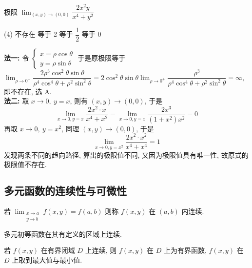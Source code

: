 \begin{example}
    极限 $\displaystyle\lim_{(x,y)\to(0,0)}\dfrac{2x^2y}{x^4+y^2}$
    \begin{tasks}(4)
        \task 不存在
        \task 等于 2
        \task 等于 $\dfrac{1}{2}$
        \task 等于 0
    \end{tasks}
\end{example}
\begin{solution}
    \textbf{法一: }令 $\begin{cases}
        x=\rho\cos\theta\\y=\rho\sin\theta
    \end{cases}$
    于是原极限等于 $\displaystyle\lim_{\rho\to0^+}\dfrac{2\rho^3\cos^2\theta\sin\theta }{\rho^4\cos^4\theta+\rho^2\sin^2\theta}=2\cos^2\theta\sin\theta\lim_{\rho\to0^+}\dfrac{\rho^3}{\rho^4\cos^4\theta+\rho^2\sin^2\theta}=\infty$, 即不存在, 选 A.\\
    \textbf{法二: }取 $x\to0,~y=x$, 则有 $(x,y)\to(0,0)$, 于是 $$\displaystyle\lim_{x\to0,y=x}\dfrac{2x^2\cdot x}{x^4+x^2}=\lim_{x\to0,y=x}\dfrac{2x^3}{(1+x^2)x^2}=0$$
    再取 $x\to0,~y=x^2$, 同理 $(x,y)\to(0,0)$, 于是 $$\displaystyle\lim_{x\to0,y=x^2}\dfrac{2x^2\cdot x^2}{x^4+x^4}=1$$
    发现两条不同的趋向路径, 算出的极限值不同, 又因为极限值具有唯一性, 故原式的极限值不存在.
\end{solution}

%     

\subsection{多元函数的连续性与可微性}

\begin{definition}
    若 $\displaystyle \lim _{\substack{x \rightarrow a \\ y \rightarrow b}} f(x, y)=f(a, b)$
    则称 $ f(x, y) $ 在 $ (a, b) $ 内连续.
\end{definition}

\begin{theorem}
    多元初等函数在其有定义的区域上连续.
\end{theorem}
\begin{theorem}
    若 $ f(x, y) $ 在有界闭域 $ D $ 上连续, 则 $ f(x, y) $ 在 $ D $ 上为有界函数, $f(x, y) $ 在 $ D $ 上取到最大值与最小值.
\end{theorem}

